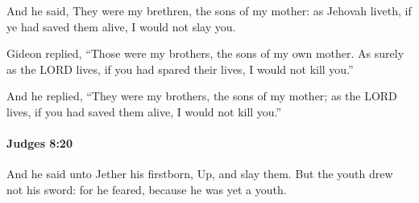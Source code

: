 			\begin{versebox}
					\item[BHS] 
					\item[ASV] And he said, They were my brethren, the sons of my mother: as Jehovah liveth, if ye had saved them alive, I would not slay you.
					\item[NIV] Gideon replied, “Those were my brothers, the sons of my own mother. As surely as the LORD lives, if you had spared their lives, I would not kill you.”
					\item[NRSV] And he replied, “They were my brothers, the sons of my mother; as the LORD lives, if you had saved them alive, I would not kill you.”
			\end{versebox}

		\paragraph{Judges 8:20} %
			\label{JUDGES-8-20}

			And he said unto Jether his firstborn, Up, and slay them. But the youth drew not his sword: for he feared, because he was yet a youth.

